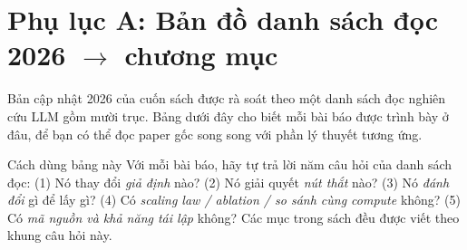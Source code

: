 
\chapter*{Phụ lục A: Bản đồ danh sách đọc 2026 \texorpdfstring{$\rightarrow$}{->} chương mục}

Bản cập nhật 2026 của cuốn sách được rà soát theo một danh sách đọc nghiên cứu LLM gồm mười trục. Bảng dưới đây cho biết mỗi bài báo được trình bày ở đâu, để bạn có thể đọc paper gốc song song với phần lý thuyết tương ứng.

\begin{deepdive}{Cách dùng bảng này}
Với mỗi bài báo, hãy tự trả lời năm câu hỏi của danh sách đọc: (1) Nó thay đổi \emph{giả định} nào? (2) Nó giải quyết \emph{nút thắt} nào? (3) Nó \emph{đánh đổi} gì để lấy gì? (4) Có \emph{scaling law / ablation / so sánh cùng compute} không? (5) Có \emph{mã nguồn và khả năng tái lập} không? Các mục trong sách đều được viết theo khung câu hỏi này.
\end{deepdive}

